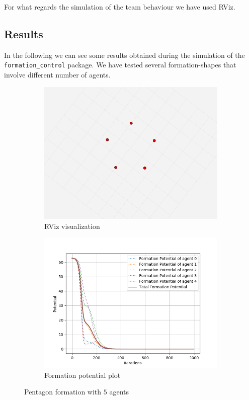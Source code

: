 \documentclass[a4paper,11pt,oneside]{book}
\begin{document}
For what regards the simulation of the team behaviour we have used RViz.

\subsection{Results}
In the following we can see some results obtained during the simulation of the \texttt{formation\_control} package. 
We have tested several formation-shapes that involve different number of agents.


\begin{figure}[h]
\centering
	\begin{subfigure}{0.49\textwidth}	
	\includegraphics[scale=0.24]{pentagon_rviz}
	\caption{RViz visualization}
	\end{subfigure}
\hfill
	\begin{subfigure}{0.49\textwidth}	
	\includegraphics[scale=0.42]{Formation_potential_pentagon}
	\caption{Formation potential plot}
	\end{subfigure}
\caption{Pentagon formation with $5$ agents}
\label{Pentagon}
\end{figure}
\end{document}
